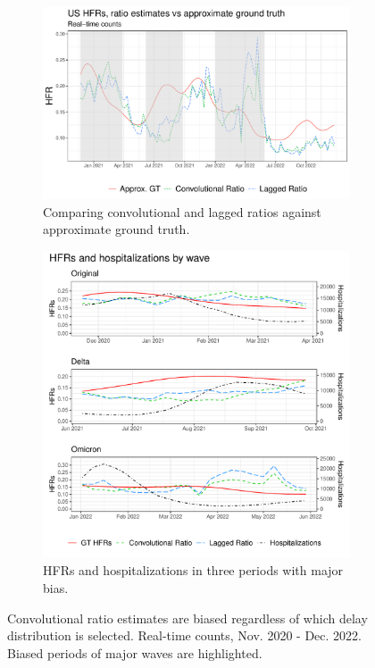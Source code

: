 \documentclass{article}
\begin{document}
\begin{figure}
     \centering
     \begin{subfigure}[b]{0.55\linewidth}
         \centering
         \includegraphics[width=\linewidth]{Figures/Real/US_ests_realtime.pdf}
         \caption{Comparing convolutional and lagged ratios against approximate ground truth.}
         \label{fig:basic_est_vs_gt}
     \end{subfigure}
     \hfill
     \begin{subfigure}[b]{0.4\linewidth}
         \centering
         \includegraphics[width=\linewidth]{Figures/Real/hfrs_by_wave.pdf}
         \caption{HFRs and hospitalizations in three periods with major bias.} 
         \label{fig:wave}
     \end{subfigure}
        \caption{Convolutional ratio estimates are biased regardless of which delay distribution is selected. Real-time counts, Nov. 2020 - Dec. 2022. Biased periods of major waves are highlighted.}
        \label{fig:basic_est_vs_gt_figs}
\end{figure}
\end{document}
